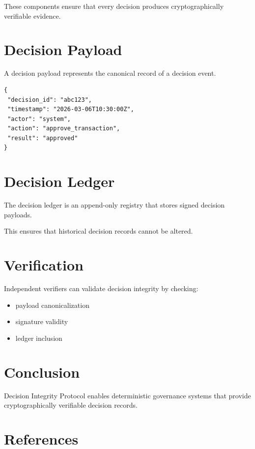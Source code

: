 \documentclass[11pt]{article}
\begin{document}
These components ensure that every decision produces cryptographically
verifiable evidence.

\section{Decision Payload}

A decision payload represents the canonical record of a decision event.

\begin{verbatim}
{
 "decision_id": "abc123",
 "timestamp": "2026-03-06T10:30:00Z",
 "actor": "system",
 "action": "approve_transaction",
 "result": "approved"
}
\end{verbatim}

\section{Decision Ledger}

The decision ledger is an append-only registry that stores signed
decision payloads.

This ensures that historical decision records cannot be altered.

\section{Verification}

Independent verifiers can validate decision integrity by checking:

\begin{itemize}
\item payload canonicalization
\item signature validity
\item ledger inclusion
\end{itemize}

\section{Conclusion}

Decision Integrity Protocol enables deterministic governance systems
that provide cryptographically verifiable decision records.


\section*{References}
\end{document}
